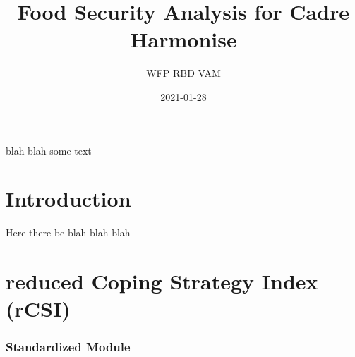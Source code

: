 \documentclass[
]{article}
\title{Food Security Analysis for Cadre Harmonise}
\author{WFP RBD VAM}
\date{2021-01-28}
\begin{document}
\maketitle

{
\setcounter{tocdepth}{2}
\tableofcontents
}
blah blah some text

\hypertarget{introduction}{%
\section{Introduction}\label{introduction}}

Here there be blah blah blah

\hypertarget{reduced-coping-strategy-index-rcsi}{%
\section{reduced Coping Strategy Index (rCSI)}\label{reduced-coping-strategy-index-rcsi}}

\hypertarget{standardized-module}{%
\subsubsection{Standardized Module}\label{standardized-module}}
\end{document}
